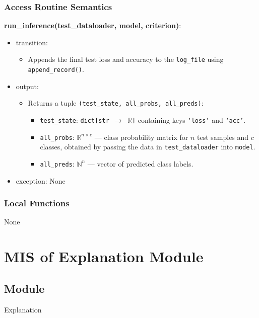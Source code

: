 \documentclass[12pt, titlepage]{article}
\begin{document}
\subsubsection{Access Routine Semantics}

\noindent \textbf{run\_inference(test\_dataloader, model, criterion)}:
\begin{itemize}
  \item transition:
  \begin{itemize}
    \item Appends the final test loss and accuracy to the \texttt{log\_file} using \texttt{append\_record()}.
  \end{itemize}
  \item output:
  \begin{itemize}
    \item Returns a tuple \texttt{(test\_state, all\_probs, all\_preds)}:
    \begin{itemize}
      \item \texttt{test\_state}: \texttt{dict[str $\rightarrow$ \(\mathbb{R}\)]} containing keys \texttt{`loss'} and \texttt{`acc'}.
      \item \texttt{all\_probs}: \(\mathbb{R}^{n \times c}\) — class probability matrix for \(n\) test samples and \(c\) classes, obtained by passing the data in \texttt{test\_dataloader} into \texttt{model}.
      \item \texttt{all\_preds}: \(\mathbb{N}^n\) — vector of predicted class labels.
    \end{itemize}
  \end{itemize}
  \item exception: None
\end{itemize}

\subsubsection{Local Functions}
None





\newpage




\section{MIS of Explanation Module} \label{Explanation}

\subsection{Module}
Explanation
\end{document}
